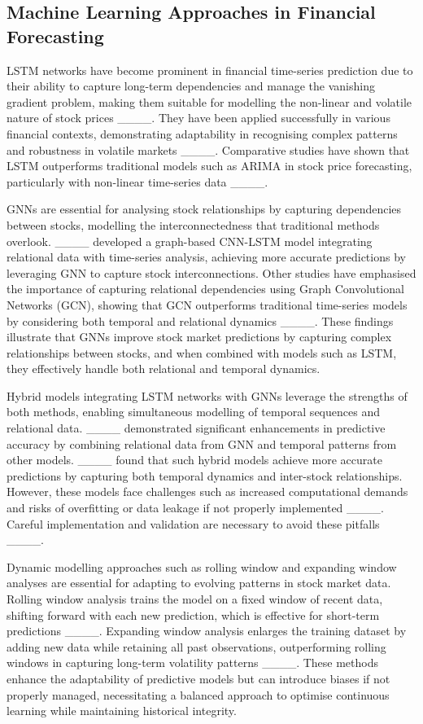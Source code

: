 \subsection{Machine Learning Approaches in Financial Forecasting}

LSTM networks have become prominent in financial time-series prediction due to their ability to capture long-term dependencies and manage the vanishing gradient problem, making them suitable for modelling the non-linear and volatile nature of stock prices ____. They have been applied successfully in various financial contexts, demonstrating adaptability in recognising complex patterns and robustness in volatile markets ____. Comparative studies have shown that LSTM outperforms traditional models such as ARIMA in stock price forecasting, particularly with non-linear time-series data ____.

GNNs are essential for analysing stock relationships by capturing dependencies between stocks, modelling the interconnectedness that traditional methods overlook. ____ developed a graph-based CNN-LSTM model integrating relational data with time-series analysis, achieving more accurate predictions by leveraging GNN to capture stock interconnections. Other studies have emphasised the importance of capturing relational dependencies using Graph Convolutional Networks (GCN), showing that GCN outperforms traditional time-series models by considering both temporal and relational dynamics ____. These findings illustrate that GNNs improve stock market predictions by capturing complex relationships between stocks, and when combined with models such as LSTM, they effectively handle both relational and temporal dynamics.

Hybrid models integrating LSTM networks with GNNs leverage the strengths of both methods, enabling simultaneous modelling of temporal sequences and relational data. ____ demonstrated significant enhancements in predictive accuracy by combining relational data from GNN and temporal patterns from other models. ____ found that such hybrid models achieve more accurate predictions by capturing both temporal dynamics and inter-stock relationships. However, these models face challenges such as increased computational demands and risks of overfitting or data leakage if not properly implemented ____. Careful implementation and validation are necessary to avoid these pitfalls ____.

Dynamic modelling approaches such as rolling window and expanding window analyses are essential for adapting to evolving patterns in stock market data. Rolling window analysis trains the model on a fixed window of recent data, shifting forward with each new prediction, which is effective for short-term predictions ____. Expanding window analysis enlarges the training dataset by adding new data while retaining all past observations, outperforming rolling windows in capturing long-term volatility patterns ____. These methods enhance the adaptability of predictive models but can introduce biases if not properly managed, necessitating a balanced approach to optimise continuous learning while maintaining historical integrity.

